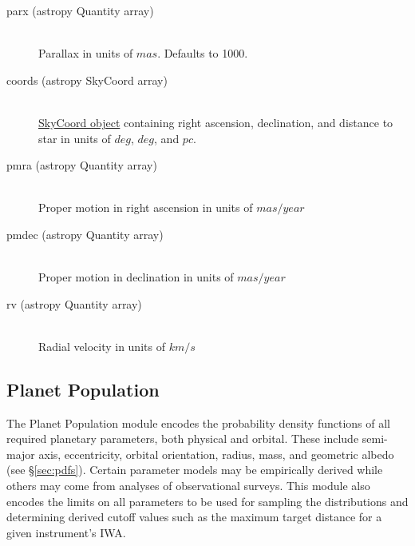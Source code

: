 \documentclass[cleanfoot]{asme2ej}
\begin{document}
\begin{itemize}
\begin{description}
    \item[parx (astropy Quantity array)] \hfill \\ Parallax in units of $ mas $. Defaults to 1000.
    \item[coords (astropy SkyCoord array)] \hfill \\ \href{http://astropy.readthedocs.org/en/latest/api/astropy.coordinates.SkyCoord.html}{SkyCoord object} containing right ascension, declination, and distance to star in units of $ deg $, $ deg $, and $ pc $.
    \item[pmra (astropy Quantity array)] \hfill \\ Proper motion in right ascension in units of $ mas/year $
    \item[pmdec (astropy Quantity array)] \hfill \\ Proper motion in declination in units of $ mas/year $
    \item[rv (astropy Quantity array)] \hfill \\ Radial velocity in units of $ km/s $
\end{description}
\end{itemize}



\subsection{Planet Population}
The Planet Population module encodes the probability density functions of all required planetary parameters, both physical and orbital. These include semi-major axis, eccentricity, orbital orientation, radius, mass, and geometric albedo (see \S\ref{sec:pdfs}). Certain parameter models may be empirically derived while others may come from analyses of observational surveys.  This module also encodes the limits on all parameters to be used for sampling the distributions and determining derived cutoff values such as the maximum target distance for a given instrument's IWA.
\end{document}
